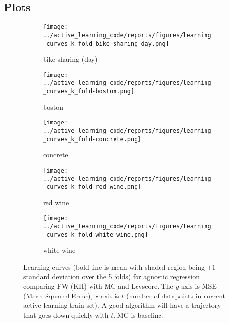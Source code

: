 \subsection{Plots}
\begin{figure}[htb]
  \label{figs:agnostic-regression-learning-curves}
  \centering
  \begin{subfigure}[b]{0.48\textwidth}
    \label{fig:learning-curve-agnostic-bike-sharing}
    \texttt{[image: ../active\_learning\_code/reports/figures/learning\_curves\_k\_fold-bike\_sharing\_day.png]}
    \caption{bike sharing (day)}
  \end{subfigure}
  \begin{subfigure}[b]{0.48\textwidth}
    \label{fig:learning-curve-agnostic-boston}
    \texttt{[image: ../active\_learning\_code/reports/figures/learning\_curves\_k\_fold-boston.png]}
    \caption{boston}
  \end{subfigure}
  \hspace{1.0cm}
  \begin{subfigure}[b]{0.48\textwidth}
    \label{fig:learning-curve-agnostic-concrete}
    \texttt{[image: ../active\_learning\_code/reports/figures/learning\_curves\_k\_fold-concrete.png]}
    \caption{concrete}
  \end{subfigure}
  \begin{subfigure}[b]{0.48\textwidth}
    \label{fig:learning-curve-agnostic-red_whine}
    \texttt{[image: ../active\_learning\_code/reports/figures/learning\_curves\_k\_fold-red\_wine.png]}
    \caption{red wine}
  \end{subfigure}
  \hspace{1.0cm}
  \begin{subfigure}[b]{0.48\textwidth}
    \label{fig:learning-curve-agnostic-white_wine}
    \texttt{[image: ../active\_learning\_code/reports/figures/learning\_curves\_k\_fold-white\_wine.png]}
    \caption{white wine}
  \end{subfigure}
  \caption{Learning curves (bold line is mean with shaded region being \(\pm 1\) standard deviation over the 5 folds) for agnostic regression comparing FW (KH) with MC and
    Levscore. The \(y\)-axis is MSE (Mean Squared Error), \(x\)-axis is \(t\)
    (number of datapoints in current active learning train set). A good
    algorithm will have a trajectory that goes down quickly with \(t\). MC is baseline.}
\end{figure}

